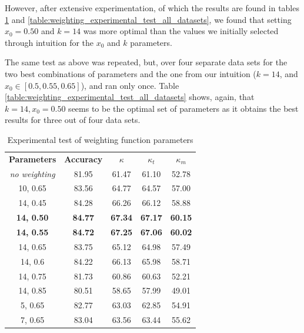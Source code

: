 However, after extensive experimentation, of which the results are found in tables \ref{table:weighting_experimental_test} and \ref{table:weighting_experimental_test_all_datasets}, we found that setting \textbf{$x_0=0.50$} and \textbf{$k=14$} was more optimal than the values we initially selected through intuition for the $x_0$ and $k$ parameters.

The same test as above was repeated, but, over four separate data sets for the two best combinations of parameters and the one from our intuition ($k=14$, and $x_0 \in [0.5, 0.55, 0.65]$), and ran only once. Table \ref{table:weighting_experimental_test_all_datasets} shows, again, that $k=14, x_0=0.50$ seems to be the optimal set of parameters as it obtains the best results for three out of four data sets.

\begin{table}[]
\caption{\label{table:weighting_experimental_test}Experimental test of weighting function parameters}
\centering
\begin{tabular}{|c|c|c|c|c|}
\hline
\textbf{Parameters} & \textbf{Accuracy} & \textbf{$\kappa$} & \textbf{$\kappa_t$} & \textbf{$\kappa_m$} \\ \hhline{=====}
\textit{no weighting}&81.95&61.47&61.10&52.78 \\ \hline
10, 0.65&83.56&64.77&64.57&57.00 \\ \hline
14, 0.45&84.28&66.26&66.12&58.88 \\ \hline
\textbf{14, 0.50}&\textbf{84.77}&\textbf{67.34}&\textbf{67.17}&\textbf{60.15} \\ \hline
\textbf{14, 0.55}&\textbf{84.72}&\textbf{67.25}&\textbf{67.06}&\textbf{60.02} \\ \hline
14, 0.65&83.75&65.12&64.98&57.49 \\ \hline
14, 0.6&84.22&66.13&65.98&58.71 \\ \hline
14, 0.75&81.73&60.86&60.63&52.21 \\ \hline
14, 0.85&80.51&58.65&57.99&49.01 \\ \hline
5, 0.65&82.77&63.03&62.85&54.91 \\ \hline
7, 0.65&83.04&63.56&63.44&55.62 \\ \hline
\end{tabular}
\end{table}

